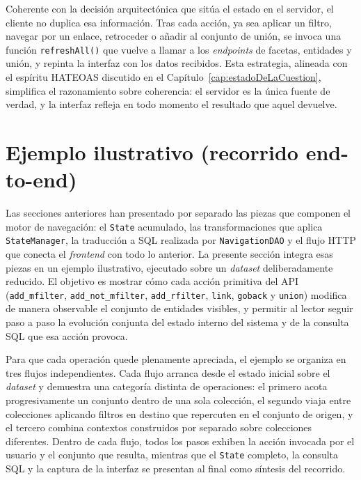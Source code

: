 Coherente con la decisión arquitectónica que sitúa el estado en el
servidor, el cliente no duplica esa información. Tras cada acción,
ya sea aplicar un filtro, navegar por un enlace, retroceder o añadir
al conjunto de unión, se invoca una función \texttt{refreshAll()} que
vuelve a llamar a los \textit{endpoints} de facetas, entidades y
unión, y repinta la interfaz con los datos recibidos. Esta estrategia,
alineada con el espíritu HATEOAS discutido en el
Capítulo~\ref{cap:estadoDeLaCuestion}, simplifica el razonamiento
sobre coherencia: el servidor es la única fuente de verdad, y la
interfaz refleja en todo momento el resultado que aquel devuelve.

\section{Ejemplo ilustrativo (recorrido end-to-end)}
\label{sec:ejemplo_recorrido}
\sloppy

Las secciones anteriores han presentado por separado las piezas que
componen el motor de navegación: el \texttt{State} acumulado, las
transformaciones que aplica \texttt{StateManager}, la traducción a SQL
realizada por \texttt{NavigationDAO} y el flujo HTTP que conecta el
\textit{frontend} con todo lo anterior. La presente sección integra esas piezas
en un ejemplo ilustrativo, ejecutado sobre un \textit{dataset} deliberadamente
reducido. El objetivo es mostrar cómo cada acción primitiva del API
(\texttt{add\_mfilter}, \texttt{add\_not\_mfilter},
\texttt{add\_rfilter}, \texttt{link}, \texttt{goback} y \texttt{union})
modifica de manera observable el conjunto de entidades visibles, y
permitir al lector seguir paso a paso la evolución conjunta del estado
interno del sistema y de la consulta SQL que esa acción provoca.

Para que cada operación quede plenamente apreciada, el ejemplo se
organiza en tres flujos independientes. Cada flujo arranca desde el
estado inicial sobre el \textit{dataset} y demuestra una categoría distinta de
operaciones: el primero acota progresivamente un conjunto dentro de una
sola colección, el segundo viaja entre colecciones aplicando filtros en
destino que repercuten en el conjunto de origen, y el tercero combina
contextos construidos por separado sobre colecciones diferentes. Dentro
de cada flujo, todos los pasos exhiben la acción invocada por el usuario
y el conjunto que resulta, mientras que el \texttt{State} completo, la
consulta SQL y la captura de la interfaz se presentan al final como
síntesis del recorrido.

